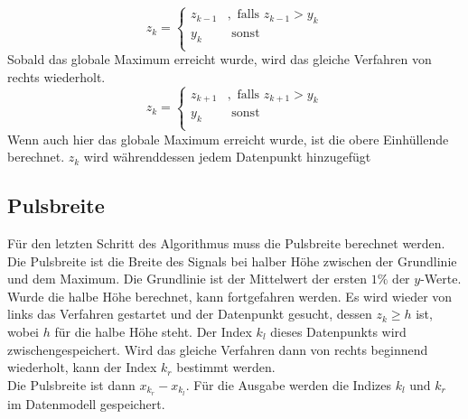 \begin{equation}
    z_k= \begin{cases}
             z_{k-1} & , \text { falls } z_{k-1} > y_k \\
             y_k & \text{ sonst }\\
    \end{cases}\label{eq:auswahl_upper_values_left}
\end{equation}
Sobald das globale Maximum erreicht wurde, wird das gleiche Verfahren von rechts wiederholt.
\begin{equation}
    z_k= \begin{cases}
             z_{k+1} & , \text { falls } z_{k+1} > y_k \\
             y_k & \text{ sonst }\\
    \end{cases}\label{eq:auswahl_upper_values_right}
\end{equation}
Wenn auch hier das globale Maximum erreicht wurde, ist die obere Einhüllende berechnet.
$z_k$ wird währenddessen jedem Datenpunkt hinzugefügt

\subsection{Pulsbreite}\label{subsec:pulsbreite}
Für den letzten Schritt des Algorithmus muss die Pulsbreite berechnet werden.
Die Pulsbreite ist die Breite des Signals bei halber Höhe zwischen der Grundlinie und dem Maximum.
Die Grundlinie ist der Mittelwert der ersten $1\% \text{ der } y$-Werte.
Wurde die halbe Höhe berechnet, kann fortgefahren werden.
Es wird wieder von links das Verfahren gestartet und der Datenpunkt gesucht, dessen $z_k \geq h$ ist, wobei $h$ für die halbe Höhe steht.
Der Index $k_l$ dieses Datenpunkts wird zwischengespeichert.
Wird das gleiche Verfahren dann von rechts beginnend wiederholt, kann der Index $k_r$ bestimmt werden.\\
Die Pulsbreite ist dann $x_{k_r} - x_{k_l}$.
Für die Ausgabe werden die Indizes $k_l \text{ und } k_r$ im Datenmodell gespeichert.

